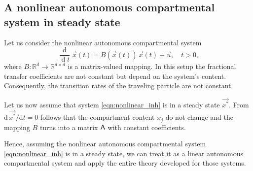 \documentclass[smallextended]{svjour3}
\newcommand{\R}{\mathbb{R}}
\newcommand{\deriv}[1]{\frac{\operatorname{d}}{\operatorname{d}#1}}
\begin{document}
\subsection{A nonlinear autonomous compartmental system in steady state}


Let us consider the nonlinear autonomous compartmental system
\begin{equation}\label{eqn:nonlinear_inh}
    \deriv{t} \vec{x}(t) = B(\vec{x}(t))\,\vec{x}(t) + \vec{u}, \quad t>0,
\end{equation}
where $B:\R^d\to \R^{d\times d}$ is a matrix-valued mapping.
In this setup the fractional transfer coefficients are not constant but depend on the system's content.
Consequently, the transition rates of the traveling particle are not constant.

Let us now assume that system \eqref{eqn:nonlinear_inh} is in a steady state $\vec{x^\ast}$.
From $\mathrm{d}\,\vec{x^\ast}/\mathrm{d}t = 0$ follows that the compartment content $x_j$ do not change and the mapping $B$ turns into a matrix $\mathsf{A}$ with constant coefficients.

Hence, assuming the nonlinear autonomous compartmental system \eqref{eqn:nonlinear_inh} is in a steady state, we can treat it as a linear autonomous compartmental system and apply the entire theory developed for those systems.
\end{document}
